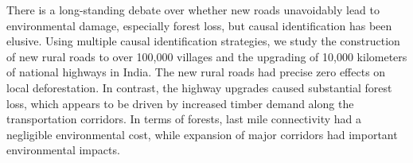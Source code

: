 There is a long-standing debate over whether new roads unavoidably
lead to environmental damage, especially forest loss, but causal
identification has been elusive. Using multiple causal identification
strategies, we study the construction of new rural roads to over
100,000 villages and the upgrading of 10,000 kilometers of national
highways in India. The new rural roads had precise zero effects on
local deforestation. In contrast, the highway upgrades caused
substantial forest loss, which appears to be driven by increased
timber demand along the transportation corridors. In terms of forests,
last mile connectivity had a negligible environmental cost, while
expansion of major corridors had important environmental impacts.
